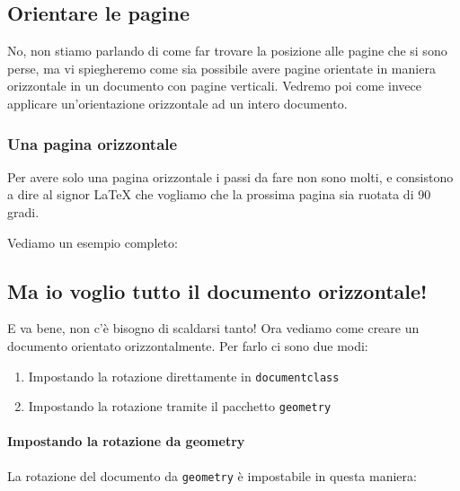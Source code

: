 \newpage
\begin{landscape}

\subsection{Orientare le pagine}

No, non stiamo parlando di come far trovare la posizione alle pagine che si 
sono perse, ma vi spiegheremo come sia possibile avere pagine orientate in 
maniera orizzontale in un documento con pagine verticali. Vedremo poi come 
invece applicare un'orientazione orizzontale ad un intero documento.

\subsubsection{Una pagina orizzontale}

Per avere solo una pagina orizzontale i passi da fare non sono molti, e 
consistono a dire al signor \LaTeX{} che vogliamo che la prossima pagina sia 
ruotata di 90 gradi.

\vspace{\abovedisplayskip}
\begin{minipage}{\linewidth}
  \noindent Vediamo un esempio completo:
  
\end{minipage}
\vspace{\belowdisplayskip}

\subsection{Ma io voglio tutto il documento orizzontale!}

E va bene, non c'è bisogno di scaldarsi tanto! Ora vediamo come creare un 
documento orientato orizzontalmente. Per farlo ci sono due modi:
\begin{enumerate}
 \item Impostando la rotazione direttamente in \texttt{documentclass}
 \item Impostando la rotazione tramite il pacchetto \texttt{geometry}
\end{enumerate}


\vspace{\abovedisplayskip}
\begin{minipage}{\linewidth}
  \paragraph*{Impostando la rotazione da geometry}
  
  La rotazione del documento da \texttt{geometry} è impostabile in questa 
  maniera:
  


\end{minipage}
\vspace{\belowdisplayskip}

\end{landscape}
\newpage
